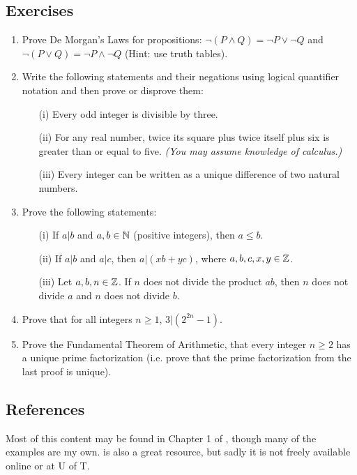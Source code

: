 \documentclass{article}
\begin{document}
\subsection{Exercises}
\begin{enumerate}
\item Prove De Morgan's Laws for propositions: $\neg (P \wedge Q) = \neg P \vee \neg Q$ and $\neg (P \vee Q) = \neg P \wedge \neg Q$ (Hint: use truth tables).
\item Write the following statements and their negations using logical quantifier notation and then prove or disprove them:
\begin{enumerate}
    \item[(i)] Every odd integer is divisible by three.
    \item [(ii)] For any real number, twice its square plus twice itself plus six is greater than or equal to five. \textit{(You may assume knowledge of calculus.)}
    \item[(iii)] Every integer can be written as a unique difference  of two natural numbers.
\end{enumerate}
\item Prove the following statements:
\begin{enumerate}
    \item[(i)] If $a | b$ and $a,b \in {\mathbb{N}}$ (positive integers), then $a \leq b$.    \item[(ii)] If $a | b$ and $a | c$, then $a | (x b + y c)$, where $a,b,c,x,y \in {\mathbb{Z}}$.
    \item[(iii)] Let $a,b,n \in {\mathbb{Z}}$. If $n$ does not divide the product $ab$, then $n$ does not divide $a$ and $n$ does not divide $b$.
\end{enumerate}
\item Prove that for all integers $n \geq 1$, $3|(2^{2n}-1)$.
\item Prove the Fundamental Theorem of Arithmetic, that every integer $n \geq 2$ has a unique prime factorization (i.e. prove that the prime factorization from the last proof is unique).
\end{enumerate}


\subsection{References}
Most of this content may be found in Chapter 1 of \cite{proofs}, though many of the examples are my own. \cite{toolsreasoning} is also a great resource, but sadly it is not freely available online or at U of T. 
\end{document}
